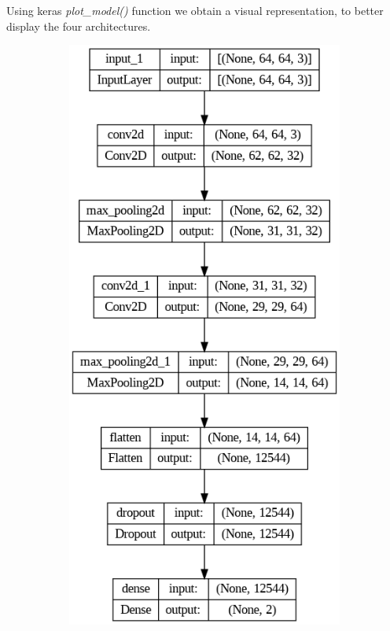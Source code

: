 \documentclass{thesisreport}
\begin{document}
Using keras \textit{plot\_model()} function we obtain a visual representation, to better display the four architectures.

\begin{figure}[h]
  \centering
  \begin{subfigure}[b]{0.2\linewidth}
    \includegraphics[width=\linewidth]{figures/original_model.png}

\end{subfigure}
\end{figure}
\end{document}
